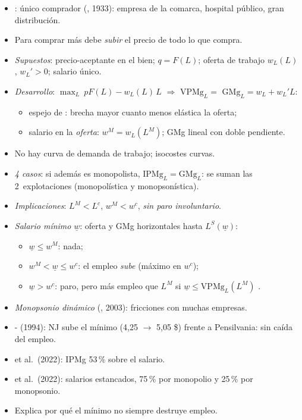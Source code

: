 \documentclass{article}
\begin{document}
\begin{columnas}
\begin{itemize}
\item {}: único comprador (, 1933): empresa de la comarca, hospital público, gran distribución.
\item Para comprar más debe \emph{subir} el precio de todo lo que compra.
\end{itemize}
\begin{itemize}
\item \emph{Supuestos}: precio-aceptante en el bien; $q=F(L)$; oferta de trabajo $w_L(L)$, $w_L'>0$; salario único.
\item \emph{Desarrollo}: $\max_L\ pF(L)-w_L(L)\,L$ $\Rightarrow$ $\mathrm{VPMg}_L=$  $\mathrm{GMg}_L=w_L+w_L'L$:
  \begin{itemize}
  \item espejo de : brecha mayor cuanto menos elástica la oferta;
  \item salario en la \emph{oferta}: $w^M=w_L(L^M)$; GMg lineal con doble pendiente.
  \end{itemize}
\item No hay curva de demanda de trabajo; isocostes curvas.
\item \emph{4 casos}: si además es monopolista, $\mathrm{IPMg}_L=\mathrm{GMg}_L$: se suman las 2~explotaciones (monopolística y monopsonística).
\item \emph{Implicaciones}: $L^M<L^c$, $w^M<w^c$, \emph{sin paro involuntario}.
\item \emph{Salario mínimo} $\underline{w}$: oferta y GMg horizontales hasta $L^S(\underline{w})$:
  \begin{itemize}
  \item $\underline{w}\leq w^M$: nada;
  \item $w^M<\underline{w}\leq w^c$: el empleo \emph{sube} (máximo en $w^c$);
  \item $\underline{w}>w^c$: paro, pero más empleo que $L^M$ si $\underline{w}\leq\mathrm{VPMg}_L(L^M)$ .
  \end{itemize}
\end{itemize}
\begin{itemize}
\item \emph{Monopsonio dinámico} (, 2003): fricciones con muchas empresas.
\item {}- (1994): NJ sube el mínimo (4,25 $\to$ 5,05 \$) frente a Pensilvania: sin caída del empleo.
\item {} et al.\ (2022): IPMg 53\,\% sobre el salario.
\item {} et al.\ (2022): salarios estancados, 75\,\% por monopolio y 25\,\% por monopsonio.
\item Explica por qué el mínimo no siempre destruye empleo.
\end{itemize}


\end{columnas}
\end{document}
